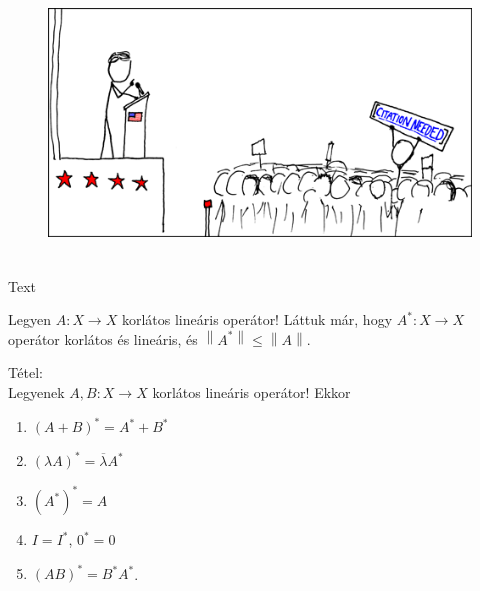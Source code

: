 \documentclass[12pt,a4paper]{scrartcl}
\providecommand{\tightlist}{%
  \setlength{\itemsep}{0pt}\setlength{\parskip}{0pt}}
\newenvironment{tetel}{}{}
\newenvironment{ajanlofig}{\begin{figure}\begin{center}}{
\end{center}\end{figure}}
\begin{document}
\begin{ajanlo}

\begin{ajanlofig}

\href{https://xkcd.com}{\includegraphics[width=5.20833in,height=2.82292in]{wikipedian_protester.png}}

\end{ajanlofig}

Text

\end{ajanlo}

Legyen \(\left. A:X\rightarrow X \right.\) korlátos lineáris operátor!
Láttuk már, hogy \(\left. A^{*}:X\rightarrow X \right.\) operátor
korlátos és lineáris, és
\(\left\| A^{*} \right\| \leq \left\| A \right\|\).

\begin{tetel}

Tétel:\\
Legyenek \(\left. A,B:X\rightarrow X \right.\) korlátos lineáris
operátor! Ekkor

\begin{enumerate}
\def\labelenumi{\arabic{enumi}.}
\tightlist
\item
  \(\left( {A + B} \right)^{*} = A^{*} + B^{*}\)
\item
  \(\left( {\lambda A} \right)^{*} = \overline{\lambda}A^{*}\)
\item
  \(\left( A^{*} \right)^{*} = A\)
\item
  \(I = I^{*}\), \(0^{*} = 0\)
\item
  \(\left( {AB} \right)^{*} = B^{*}A^{*}\).
\end{enumerate}

\end{tetel}
\end{document}
